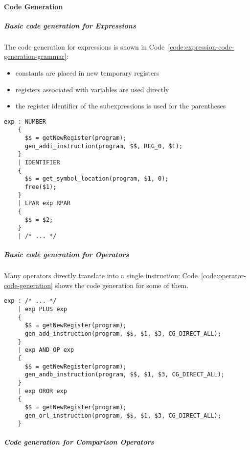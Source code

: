 \documentclass[english]{article}
\begin{document}
\paragraph{Code Generation}

\subparagraph*{Basic code generation for Expressions}

The code generation for expressions is shown in Code~\ref{code:expression-code-generation-grammar}:
\begin{itemize}
  \item constants are placed in new temporary registers
  \item registers associated with variables are used directly
  \item the register identifier of the subexpressions is used for the parentheses
\end{itemize}

\begin{onepage}
  \begin{lstlisting}[language=LANCE, caption={Expression code generation grammar}, label={code:expression-code-generation-grammar}]
exp : NUMBER
    {
      $$ = getNewRegister(program);
      gen_addi_instruction(program, $$, REG_0, $1);
    }
    | IDENTIFIER
    {
      $$ = get_symbol_location(program, $1, 0);
      free($1);
    }
    | LPAR exp RPAR
    {
      $$ = $2;
    }
    | /* ... */
\end{lstlisting}
\end{onepage}

\subparagraph*{Basic code generation for Operators}

Many operators directly translate into a single \mace instruction;
Code~\ref{code:operator-code-generation} shows the code generation for some of them.

\begin{onepage}
  \begin{lstlisting}[language=LANCE, caption={Operator code generation}, label={code:operator-code-generation}]
exp : /* ... */
    | exp PLUS exp
    {
      $$ = getNewRegister(program);
      gen_add_instruction(program, $$, $1, $3, CG_DIRECT_ALL);
    }
    | exp AND_OP exp
    {
      $$ = getNewRegister(program);
      gen_andb_instruction(program, $$, $1, $3, CG_DIRECT_ALL);
    }
    | exp OROR exp
    {
      $$ = getNewRegister(program);
      gen_orl_instruction(program, $$, $1, $3, CG_DIRECT_ALL);
    }
\end{lstlisting}
\end{onepage}

\subparagraph*{Code generation for Comparison Operators}
\end{document}
